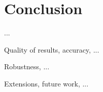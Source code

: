 \chapter{Conclusion}
\label{chapter:conclusion}

...

Quality of results, accuracy, ...

Robustness, ...

Extensions, future work, ...